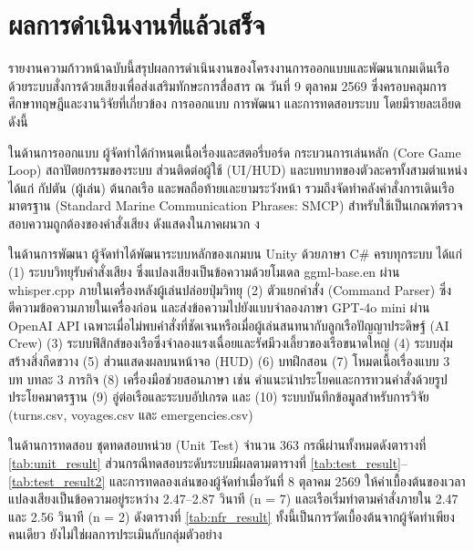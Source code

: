 
\section{ผลการดำเนินงานที่แล้วเสร็จ}

รายงานความก้าวหน้าฉบับนี้สรุปผลการดำเนินงานของโครงงานการออกแบบและพัฒนาเกมเดินเรือด้วยระบบสั่งการด้วยเสียงเพื่อส่งเสริมทักษะการสื่อสาร ณ วันที่ 9 ตุลาคม 2569 ซึ่งครอบคลุมการศึกษาทฤษฎีและงานวิจัยที่เกี่ยวข้อง การออกแบบ การพัฒนา และการทดสอบระบบ โดยมีรายละเอียดดังนี้

ในด้านการออกแบบ ผู้จัดทำได้กำหนดเนื้อเรื่องและสตอรี่บอร์ด กระบวนการเล่นหลัก (Core Game Loop) สถาปัตยกรรมของระบบ ส่วนติดต่อผู้ใช้ (UI/HUD) และบทบาทของตัวละครทั้งสามตำแหน่ง ได้แก่ กัปตัน (ผู้เล่น) ต้นกลเรือ และพลถือท้ายและยามระวังหน้า รวมถึงจัดทำคลังคำสั่งการเดินเรือมาตรฐาน (Standard Marine Communication Phrases: SMCP) สำหรับใช้เป็นเกณฑ์ตรวจสอบความถูกต้องของคำสั่งเสียง ดังแสดงในภาคผนวก ง

ในด้านการพัฒนา ผู้จัดทำได้พัฒนาระบบหลักของเกมบน Unity ด้วยภาษา C\# ครบทุกระบบ ได้แก่ (1) ระบบวิทยุรับคำสั่งเสียง ซึ่งแปลงเสียงเป็นข้อความด้วยโมเดล ggml-base.en ผ่าน whisper.cpp ภายในเครื่องหลังผู้เล่นปล่อยปุ่มวิทยุ (2) ตัวแยกคำสั่ง (Command Parser) ซึ่งตีความข้อความภายในเครื่องก่อน และส่งข้อความไปยังแบบจำลองภาษา GPT-4o mini ผ่าน OpenAI API เฉพาะเมื่อไม่พบคำสั่งที่ชัดเจนหรือเมื่อผู้เล่นสนทนากับลูกเรือปัญญาประดิษฐ์ (AI Crew) (3) ระบบฟิสิกส์ของเรือซึ่งจำลองแรงเฉื่อยและรัศมีวงเลี้ยวของเรือขนาดใหญ่ (4) ระบบสุ่มสร้างสิ่งกีดขวาง (5) ส่วนแสดงผลบนหน้าจอ (HUD) (6) บทฝึกสอน (7) โหมดเนื้อเรื่องแบบ 3 บท บทละ 3 ภารกิจ (8) เครื่องมือช่วยสอนภาษา เช่น คำแนะนำประโยคและการทวนคำสั่งด้วยรูปประโยคมาตรฐาน (9) อู่ต่อเรือและระบบอัปเกรด และ (10) ระบบบันทึกข้อมูลสำหรับการวิจัย (turns.csv, voyages.csv และ emergencies.csv)

ในด้านการทดสอบ ชุดทดสอบหน่วย (Unit Test) จำนวน 363 กรณีผ่านทั้งหมดดังตารางที่ \ref{tab:unit_result} ส่วนกรณีทดสอบระดับระบบมีผลตามตารางที่ \ref{tab:test_result}--\ref{tab:test_result2} และการทดลองเล่นของผู้จัดทำเมื่อวันที่ 8 ตุลาคม 2569 ให้ค่าเบื้องต้นของเวลาแปลงเสียงเป็นข้อความอยู่ระหว่าง 2.47--2.87 วินาที (n = 7) และเรือเริ่มทำตามคำสั่งภายใน 2.47 และ 2.56 วินาที (n = 2) ดังตารางที่ \ref{tab:nfr_result} ทั้งนี้เป็นการวัดเบื้องต้นจากผู้จัดทำเพียงคนเดียว ยังไม่ใช่ผลการประเมินกับกลุ่มตัวอย่าง

